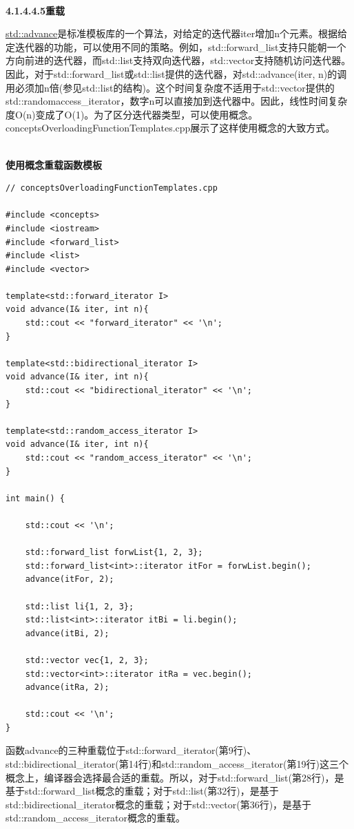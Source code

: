 \hspace*{\fill} \\ %
\noindent
\textbf{4.1.4.4.5\hspace{0.2cm}重载}

\href{https://en.cppreference.com/w/cpp/iterator/advance}{std::advance}是标准模板库的一个算法，对给定的迭代器iter增加n个元素。根据给定迭代器的功能，可以使用不同的策略。例如，std::forward\_list支持只能朝一个方向前进的迭代器，而std::list支持双向迭代器，std::vector支持随机访问迭代器。因此，对于std::forward\_list或std::list提供的迭代器，对std::advance(iter, n)的调用必须加n倍(参见std::list的结构)。这个时间复杂度不适用于std::vector提供的std::randomaccess\_iterator，数字n可以直接加到迭代器中。因此，线性时间复杂度O(n)变成了O(1)。为了区分迭代器类型，可以使用概念。conceptsOverloadingFunctionTemplates.cpp展示了这样使用概念的大致方式。

\hspace*{\fill} \\ %
\noindent
\textbf{使用概念重载函数模板}
\begin{lstlisting}[style=styleCXX]
// conceptsOverloadingFunctionTemplates.cpp

#include <concepts>
#include <iostream>
#include <forward_list>
#include <list>
#include <vector>

template<std::forward_iterator I>
void advance(I& iter, int n){
	std::cout << "forward_iterator" << '\n';
}

template<std::bidirectional_iterator I>
void advance(I& iter, int n){
	std::cout << "bidirectional_iterator" << '\n';
}

template<std::random_access_iterator I>
void advance(I& iter, int n){
	std::cout << "random_access_iterator" << '\n';
}

int main() {

	std::cout << '\n';
	
	std::forward_list forwList{1, 2, 3};
	std::forward_list<int>::iterator itFor = forwList.begin();
	advance(itFor, 2);
	
	std::list li{1, 2, 3};
	std::list<int>::iterator itBi = li.begin();
	advance(itBi, 2);
	
	std::vector vec{1, 2, 3};
	std::vector<int>::iterator itRa = vec.begin();
	advance(itRa, 2);
	
	std::cout << '\n';
}
\end{lstlisting}

函数advance的三种重载位于std::forward\_iterator(第9行)、std::bidirectional\_iterator(第14行)和std::random\_access\_iterator(第19行)这三个概念上，编译器会选择最合适的重载。所以，对于std::forward\_list(第28行)，是基于std::forward\_list概念的重载；对于std::list(第32行)，是基于std::bidirectional\_iterator概念的重载；对于std::vector(第36行)，是基于std::random\_access\_iterator概念的重载。

